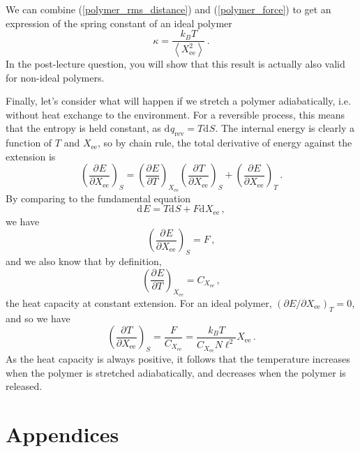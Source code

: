 \documentclass{article}
\theoremstyle{plain}\theoremheaderfont{\normalfont\bfseries}\theorembodyfont{\rmfamily}\theoremseparator{.}\newtheorem*{thm}{Theorem}\newtheorem*{law}{Law}\newtheorem*{pos}{Postulate}
\numberwithin{equation}{section}
\renewcommand{\d}[2][]{\mathrm{d}^{#1} #2}
\newcommand{\pdv}[3][]{\frac{\partial^{#1} #2}{{\partial #3}^{#1}}}
\newcommand{\eval}[1]{\left\langle #1 \right\rangle}
\begin{document}
    We can combine (\ref{polymer_rms_distance}) and (\ref{polymer_force}) to get an expression of the spring constant of an ideal polymer
    \begin{equation}
        \kappa=\frac{k_B T}{\eval{X_{\text{ee}}^2}}\,.
    \end{equation}
    In the post-lecture question, you will show that this result is actually also valid for non-ideal polymers.

    Finally, let's consider what will happen if we stretch a polymer adiabatically, i.e. without heat exchange to the environment. For a reversible process, this means that the entropy is held constant, as \(\d{q_{\text{rev}}}=T\d{S}\). The internal energy is clearly a function of \(T\) and \(X_{\text{ee}}\), so by chain rule, the total derivative of energy against the extension is
    \begin{equation}
        \left(\pdv{E}{X_{\text{ee}}}\right)_{S}=\left(\pdv{E}{T}\right)_{X_{\text{ee}}}\left(\pdv{T}{X_{\text{ee}}}\right)_{S}+\left(\pdv{E}{X_{\text{ee}}}\right)_{T}\,.
    \end{equation}
    By comparing to the fundamental equation
    \begin{equation}
        \d{E}=T\d{S}+F\d{X_{\text{ee}}}\,,
    \end{equation}
    we have
    \begin{equation}
        \left(\pdv{E}{X_{\text{ee}}}\right)_{S}=F\,,
    \end{equation}
    and we also know that by definition,
    \begin{equation}
        \left(\pdv{E}{T}\right)_{X_{\text{ee}}}=C_{X_{\text{ee}}}\,,
    \end{equation}
    the heat capacity at constant extension. For an ideal polymer, \((\partial E/\partial X_{\text{ee}})_T=0\), and so we have
    \begin{equation}
        \left(\pdv{T}{X_{\text{ee}}}\right)_{S}=\frac{F}{C_{X_{\text{ee}}}}=\frac{k_B T}{C_{X_{\text{ee}}}N\ell^2}X_{\text{ee}}\,.
    \end{equation}
    As the heat capacity is always positive, it follows that the temperature increases when the polymer is stretched adiabatically, and decreases when the polymer is released.



    \newpage
    \part*{Appendices}
    \appendix
\end{document}
